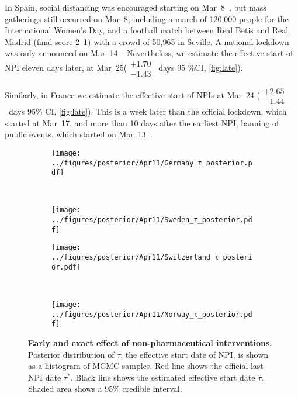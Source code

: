 \documentclass[12pt]{extarticle}
\begin{document}
In Spain, social distancing was encouraged starting on Mar~8~\citep{Flaxman2020}, but mass gatherings still occurred on Mar~8, including a march of 120,000 people for the \href{https://www.nytimes.com/2020/03/13/world/europe/spain-coronavirus-emergency.html}{International Women's Day}, and a football match between \href{https://www.espn.com/soccer/match?gameId=550350}{Real Betis and Real Madrid} (final score 2--1) with a crowd of 50,965 in Seville.
A national lockdown was only announced on Mar~14~\citep{Flaxman2020}.
Nevertheless, we estimate the effective start of NPI eleven days later, at Mar~25($\substack{+1.70 \\ -1.43}$~days 95 \%CI, \autoref{fig:late}).

Similarly, in France we estimate the effective start of NPIs at Mar~24 ($\substack{+2.65 \\ -1.44}$~days 95\% CI, \autoref{fig:late}).
This is a week later than the official lockdown, which started at Mar~17, and more than 10 days after the earliest NPI, banning of public events, which started on Mar~13~\citep{Flaxman2020}.



\begin{figure}[h]
    \centering
    \begin{subfigure}{0.45\textwidth}
        \texttt{[image: ../figures/posterior/Apr11/Germany\_τ\_posterior.pdf]}
    \end{subfigure}
    ~
    \begin{subfigure}{0.45\textwidth}
		\texttt{[image: ../figures/posterior/Apr11/Sweden\_τ\_posterior.pdf]}
    \end{subfigure}
    
	\begin{subfigure}{0.45\textwidth}
        \texttt{[image: ../figures/posterior/Apr11/Switzerland\_τ\_posterior.pdf]}
    \end{subfigure}
    ~
    \begin{subfigure}{0.45\textwidth}
		\texttt{[image: ../figures/posterior/Apr11/Norway\_τ\_posterior.pdf]}
    \end{subfigure}
    \caption{
    \textbf{Early and exact effect of non-pharmaceutical interventions.}
    Posterior distribution of $\tau$, the effective start date of NPI, is shown as a histogram of MCMC samples. Red line shows the official last NPI date $\tau^*$. Black line shows the estimated effective start date $\hat{\tau}$. Shaded area shows a 95\% credible interval. 
	}
	\label{fig:early}
\end{figure}
\end{document}

